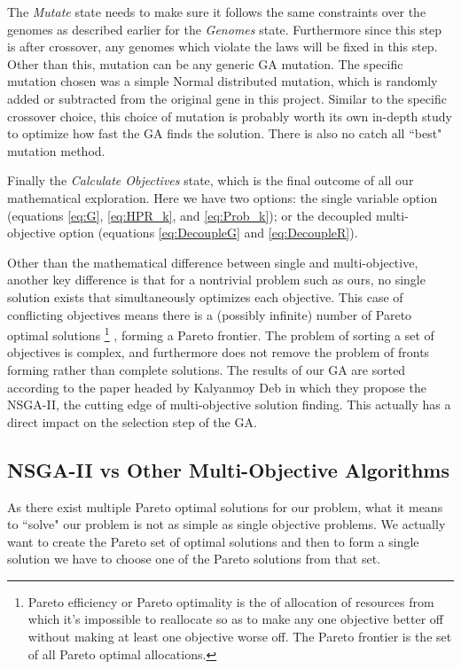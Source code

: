\documentclass[11pt]{article}
\begin{document}
    The \textit{Mutate} state needs to make sure it follows the same constraints over
    the genomes as described earlier for the \textit{Genomes} state. Furthermore since this step is
    after crossover,
    any genomes which violate the laws will be fixed in this step. Other than this,
    mutation can be any generic GA mutation. The specific mutation chosen was a
    simple Normal distributed mutation, which is randomly added or subtracted from
    the original gene in this project. Similar to the specific crossover choice, this choice
    of mutation is probably worth its own in-depth study to optimize how fast
    the GA finds the solution. There is also no catch all ``best" mutation method.

    Finally the \textit{Calculate Objectives} state, which is the final outcome of all our
    mathematical exploration. Here we have two options: the single variable option (equations
    \ref{eq:G}, \ref{eq:HPR_k}, and \ref{eq:Prob_k}); or the decoupled multi-objective
    option (equations \ref{eq:DecoupleG} and \ref{eq:DecoupleR}).

    Other than the mathematical difference between single and multi-objective,
    another key difference is that for a
    nontrivial problem such as ours, no single solution exists that simultaneously
    optimizes each objective. This case of conflicting objectives means there is
    a (possibly infinite) number of Pareto optimal solutions
    \footnote{Pareto efficiency or Pareto optimality is the of allocation of resources from which it's impossible to reallocate so as to make any one objective better off without making at least one objective worse off. The Pareto frontier is the set of all Pareto optimal allocations.}
    , forming a Pareto frontier.
    The problem of sorting a set of objectives is complex, and furthermore
    does not remove the problem of fronts forming rather than complete solutions.
    The results of our GA are sorted according to the paper headed by
    Kalyanmoy Deb \cite{DebPratapAgarwalMeyarivan} in which they propose the
    NSGA-II, the cutting edge of multi-objective solution finding. This actually
    has a direct impact on the selection step of the GA.

\subsection{NSGA-II vs Other Multi-Objective Algorithms}

    As there exist multiple Pareto optimal solutions for our problem, what it means to ``solve"
    our problem is not as simple as single objective problems. We actually want to create the
    Pareto set of optimal solutions and then to form a single solution we have to choose one of
    the Pareto solutions from that set.
\end{document}
